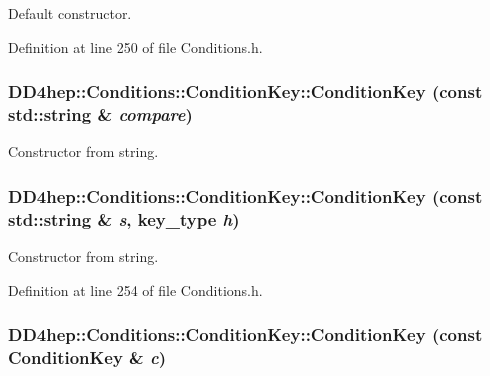 Default constructor. 

Definition at line 250 of file Conditions.h.\hypertarget{class_d_d4hep_1_1_conditions_1_1_condition_key_a728bf6933d7d2d6069bd93d26f17432c}{
\subsubsection[{ConditionKey}]{\setlength{\rightskip}{0pt plus 5cm}DD4hep::Conditions::ConditionKey::ConditionKey (const std::string \& {\em compare})}}
\label{class_d_d4hep_1_1_conditions_1_1_condition_key_a728bf6933d7d2d6069bd93d26f17432c}


Constructor from string. \hypertarget{class_d_d4hep_1_1_conditions_1_1_condition_key_a18c78ead871dbf313c582dad6e2ae336}{
\subsubsection[{ConditionKey}]{\setlength{\rightskip}{0pt plus 5cm}DD4hep::Conditions::ConditionKey::ConditionKey (const std::string \& {\em s}, \/  {\bf key\_\-type} {\em h})}}
\label{class_d_d4hep_1_1_conditions_1_1_condition_key_a18c78ead871dbf313c582dad6e2ae336}


Constructor from string. 

Definition at line 254 of file Conditions.h.\hypertarget{class_d_d4hep_1_1_conditions_1_1_condition_key_a66405dd06d894a5f871f8ad8640f1db5}{
\subsubsection[{ConditionKey}]{\setlength{\rightskip}{0pt plus 5cm}DD4hep::Conditions::ConditionKey::ConditionKey (const {\bf ConditionKey} \& {\em c})}}
\label{class_d_d4hep_1_1_conditions_1_1_condition_key_a66405dd06d894a5f871f8ad8640f1db5}


